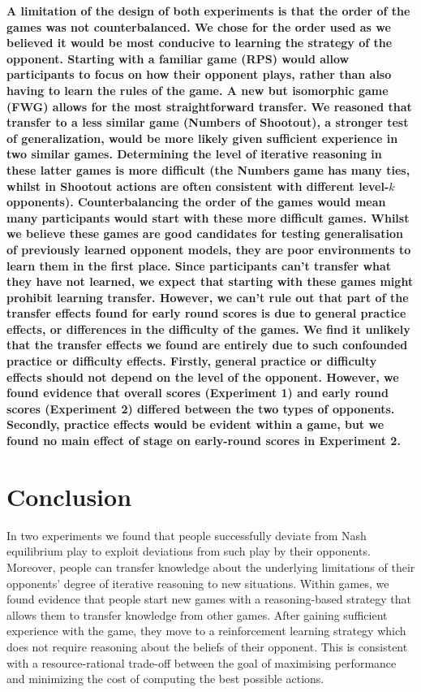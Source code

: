 \documentclass[smallextended]{svjour3}       %
\begin{document}
\textbf{A limitation of the design of both experiments is that the order
of the games was not counterbalanced. We chose for the order used as we
believed it would be most conducive to learning the strategy of the
opponent. Starting with a familiar game (RPS) would allow participants
to focus on how their opponent plays, rather than also having to learn
the rules of the game. A new but isomorphic game (FWG) allows for the
most straightforward transfer. We reasoned that transfer to a less
similar game (Numbers of Shootout), a stronger test of generalization,
would be more likely given sufficient experience in two similar games.
Determining the level of iterative reasoning in these latter games is
more difficult (the Numbers game has many ties, whilst in Shootout
actions are often consistent with different level-\(k\) opponents).
Counterbalancing the order of the games would mean many participants
would start with these more difficult games. Whilst we believe these
games are good candidates for testing generalisation of previously
learned opponent models, they are poor environments to learn them in the
first place. Since participants can't transfer what they have not
learned, we expect that starting with these games might prohibit
learning transfer. However, we can't rule out that part of the transfer
effects found for early round scores is due to general practice effects,
or differences in the difficulty of the games. We find it unlikely that
the transfer effects we found are entirely due to such confounded
practice or difficulty effects. Firstly, general practice or difficulty
effects should not depend on the level of the opponent. However, we
found evidence that overall scores (Experiment 1) and early round scores
(Experiment 2) differed between the two types of opponents. Secondly,
practice effects would be evident within a game, but we found no main
effect of stage on early-round scores in Experiment 2. }

\hypertarget{conclusion}{%
\section{Conclusion}\label{conclusion}}

In two experiments we found that people successfully deviate from Nash
equilibrium play to exploit deviations from such play by their
opponents. Moreover, people can transfer knowledge about the underlying
limitations of their opponents' degree of iterative reasoning to new
situations. Within games, we found evidence that people start new games
with a reasoning-based strategy that allows them to transfer knowledge
from other games. After gaining sufficient experience with the game,
they move to a reinforcement learning strategy which does not require
reasoning about the beliefs of their opponent. This is consistent with a
resource-rational trade-off between the goal of maximising performance
and minimizing the cost of computing the best possible actions.
\end{document}
